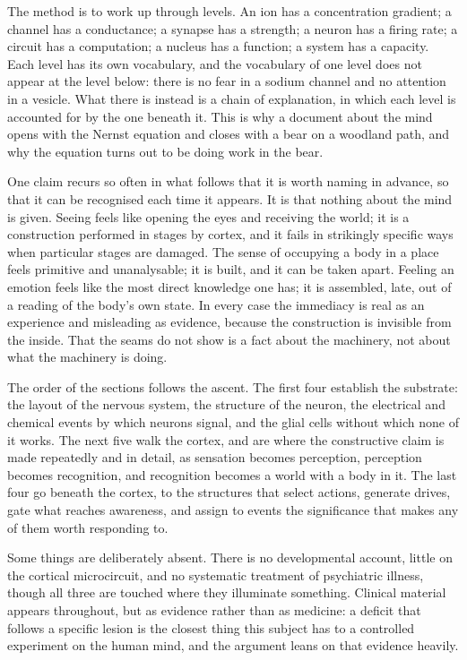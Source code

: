 \documentclass[11pt]{article}
\begin{document}
The method is to work up through levels. An ion has a concentration gradient; a channel has a conductance; a synapse has a strength; a neuron has a firing rate; a circuit has a computation; a nucleus has a function; a system has a capacity. Each level has its own vocabulary, and the vocabulary of one level does not appear at the level below: there is no fear in a sodium channel and no attention in a vesicle. What there is instead is a chain of explanation, in which each level is accounted for by the one beneath it. This is why a document about the mind opens with the Nernst equation and closes with a bear on a woodland path, and why the equation turns out to be doing work in the bear.

One claim recurs so often in what follows that it is worth naming in advance, so that it can be recognised each time it appears. It is that nothing about the mind is given. Seeing feels like opening the eyes and receiving the world; it is a construction performed in stages by cortex, and it fails in strikingly specific ways when particular stages are damaged. The sense of occupying a body in a place feels primitive and unanalysable; it is built, and it can be taken apart. Feeling an emotion feels like the most direct knowledge one has; it is assembled, late, out of a reading of the body's own state. In every case the immediacy is real as an experience and misleading as evidence, because the construction is invisible from the inside. That the seams do not show is a fact about the machinery, not about what the machinery is doing.

The order of the sections follows the ascent. The first four establish the substrate: the layout of the nervous system, the structure of the neuron, the electrical and chemical events by which neurons signal, and the glial cells without which none of it works. The next five walk the cortex, and are where the constructive claim is made repeatedly and in detail, as sensation becomes perception, perception becomes recognition, and recognition becomes a world with a body in it. The last four go beneath the cortex, to the structures that select actions, generate drives, gate what reaches awareness, and assign to events the significance that makes any of them worth responding to.

Some things are deliberately absent. There is no developmental account, little on the cortical microcircuit, and no systematic treatment of psychiatric illness, though all three are touched where they illuminate something. Clinical material appears throughout, but as evidence rather than as medicine: a deficit that follows a specific lesion is the closest thing this subject has to a controlled experiment on the human mind, and the argument leans on that evidence heavily.
\end{document}
